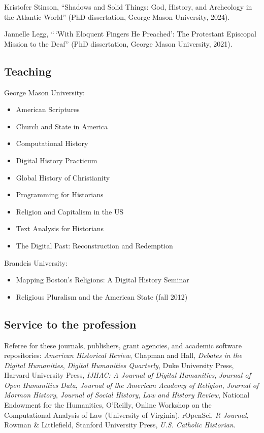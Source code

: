 \documentclass[11pt]{article}
\providecommand{\tightlist}{%
  \setlength{\itemsep}{0pt}\setlength{\parskip}{0pt}}
\begin{document}
Kristofer Stinson, ``Shadows and Solid Things: God, History, and Archeology in 
the Atlantic World'' (PhD dissertation, George Mason University, 2024).

Jannelle Legg, ``\,`With Eloquent Fingers He Preached': The Protestant Episcopal Mission to the Deaf'' (PhD dissertation, George Mason University, 2021).

\subsection{Teaching}\label{Teaching}

George Mason University:

\vspace{-0.15in}

\begin{itemize}
    \tightlist
  \item American Scriptures 
  \item Church and State in America
  \item Computational History 
  \item Digital History Practicum
  \item Global History of Christianity 
  \item Programming for Historians 
  \item Religion and Capitalism in the US 
  \item Text Analysis for Historians 
  \item The Digital Past: Reconstruction and Redemption
\end{itemize}

\vspace{-0.1in}

Brandeis University:

\vspace{-0.15in}

\begin{itemize}
    \tightlist
  \item
    Mapping Boston's Religions: A Digital History Seminar 
  \item
    Religious Pluralism and the American State (fall 2012)
\end{itemize}

\subsection{Service to the profession}\label{Service to the profession}

Referee for these journals, publishers, grant agencies, and academic software 
repositories: \emph{American Historical Review}, Chapman and Hall, \emph{Debates 
in the Digital Humanities}, \emph{Digital Humanities Quarterly}, Duke University 
Press, Harvard University Press, \emph{IJHAC: A Journal of Digital Humanities}, 
\emph{Journal of Open Humanities Data}, \emph{Journal of the American Academy of 
Religion}, \emph{Journal of Mormon History}, \emph{Journal of Social History}, 
\emph{Law and History Review}, National Endowment for the Humanities, O'Reilly, 
Online Workshop on the Computational Analysis of Law (University of Virginia),
rOpenSci, \emph{R Journal}, Rowman \& Littlefield, Stanford University Press,
\emph{U.S. Catholic Historian}.
\end{document}
